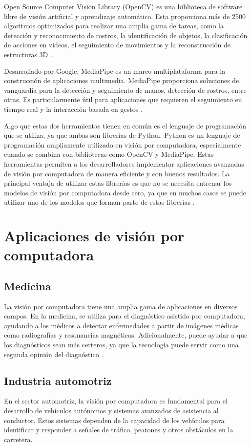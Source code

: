 Open Source Computer Vision Library (OpenCV) es una biblioteca de software libre de visión artificial y aprendizaje automático.
Esta proporciona más de 2500 algoritmos optimizados para realizar una amplia gama de tareas, como la detección y reconocimiento de rostros, la identificación de objetos, la clasificación de acciones en videos, el seguimiento de movimientos y la reconstrucción de estructuras 3D \cite{opencv2024}.

Desarrollado por Google, MediaPipe es un marco multiplataforma para la construcción de aplicaciones multimedia.
MediaPipe proporciona soluciones de vanguardia para la detección y seguimiento de manos, detección de rostros, entre otras.
Es particularmente útil para aplicaciones que requieren el seguimiento en tiempo real y la interacción basada en gestos \cite{google2024}.

Algo que estas dos herramientas tienen en común es el lenguaje de programación que se utiliza, ya que ambas son librerías de Python.
Python es un lenguaje de programación ampliamente utilizado en visión por computadora, especialmente cuando se combina con bibliotecas como OpenCV y MediaPipe.
Estas herramientas permiten a los desarrolladores implementar aplicaciones avanzadas de visión por computadora de manera eficiente y con buenos resultados.
La principal ventaja de utilizar estas librerías es que no se necesita entrenar los modelos de visión por computadora desde cero, ya que en muchos casos se puede utilizar uno de los modelos que forman parte de estas librerías \cite{altunay2019}.

\section{Aplicaciones de visión por computadora}

\subsection{Medicina}
La visión por computadora tiene una amplia gama de aplicaciones en diversos campos. 
En la medicina, se utiliza para el diagnóstico asistido por computadora, ayudando a los médicos a detectar enfermedades a partir de imágenes médicas como radiografías y resonancias magnéticas. 
Adicionalmente, puede ayudar a que los diagnósticos sean más certeros, ya que la tecnología puede servir como una segunda opinión del diagnóstico \cite{goldsmith2021}.

\subsection{Industria automotriz}
En el sector automotriz, la visión por computadora es fundamental para el desarrollo de vehículos autónomos y sistemas avanzados de asistencia al conductor. 
Estos sistemas dependen de la capacidad de los vehículos para identificar y responder a señales de tráfico, peatones y otros obstáculos en la carretera.

